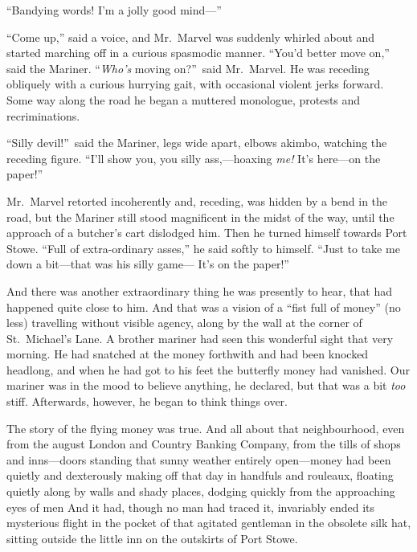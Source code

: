 “Bandying words! I’m a jolly good mind—”

“Come up,” said a voice, and Mr.\ Marvel was suddenly whirled about and started marching off in a curious spasmodic manner. “You’d better move on,” said the Mariner. “\emph{Who’s} moving on?”\ said Mr.\ Marvel. He was receding obliquely with a curious hurrying gait, with occasional violent jerks forward. Some way along the road he began a muttered monologue, protests and recriminations.

“Silly devil!”\ said the Mariner, legs wide apart, elbows akimbo, watching the receding figure. “I’ll show you, you silly ass,—hoaxing \emph{me!} It’s here—on the paper!”

Mr.\ Marvel retorted incoherently and, receding, was hidden by a bend in the road, but the Mariner still stood magnificent in the midst of the way, until the approach of a butcher’s cart dislodged him. Then he turned himself towards Port Stowe. “Full of extra-ordinary asses,” he said softly to himself. “Just to take me down a bit—that was his silly game— It’s on the paper!”

And there was another extraordinary thing he was presently to hear, that had happened quite close to him. And that was a vision of a “fist full of money” (no less) travelling without visible agency, along by the wall at the corner of St.\ Michael’s Lane. A brother mariner had seen this wonderful sight that very morning. He had snatched at the money forthwith and had been knocked headlong, and when he had got to his feet the butterfly money had vanished. Our mariner was in the mood to believe anything, he declared, but that was a bit \emph{too} stiff. Afterwards, however, he began to think things over.

The story of the flying money was true. And all about that neighbourhood, even from the august London and Country Banking Company, from the tills of shops and inns—doors standing that sunny weather entirely open—money had been quietly and dexterously making off that day in handfuls and rouleaux, floating quietly along by walls and shady places, dodging quickly from the approaching eyes of men And it had, though no man had traced it, invariably ended its mysterious flight in the pocket of that agitated gentleman in the obsolete silk hat, sitting outside the little inn on the outskirts of Port Stowe.